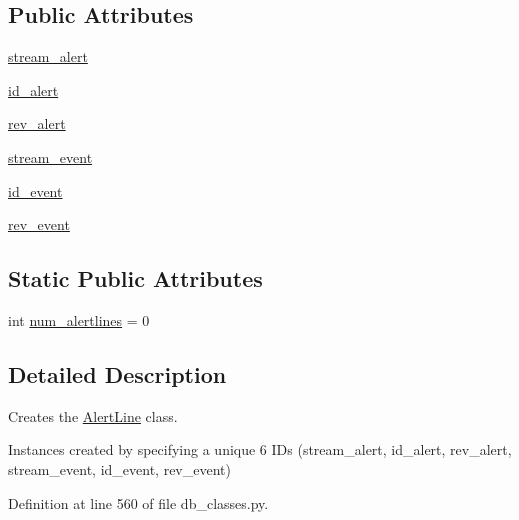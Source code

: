 \subsection*{Public Attributes}
\begin{DoxyCompactItemize}
\item 
\hyperlink{classamonpy_1_1dbase_1_1db__classes_1_1_alert_line_ab24de2d5e3f4418dc2b9c6c68c42ae41}{stream\-\_\-alert}
\item 
\hyperlink{classamonpy_1_1dbase_1_1db__classes_1_1_alert_line_afe155f528e6c01f810d95264e77ccee6}{id\-\_\-alert}
\item 
\hyperlink{classamonpy_1_1dbase_1_1db__classes_1_1_alert_line_acb48088679522c813ac7ad21924f98a1}{rev\-\_\-alert}
\item 
\hyperlink{classamonpy_1_1dbase_1_1db__classes_1_1_alert_line_a6081f9c41c7c34d54a565407f2308175}{stream\-\_\-event}
\item 
\hyperlink{classamonpy_1_1dbase_1_1db__classes_1_1_alert_line_abbf3c5c8916d6a655444f44a841705f7}{id\-\_\-event}
\item 
\hyperlink{classamonpy_1_1dbase_1_1db__classes_1_1_alert_line_a5180b21c821a1eb9540d88623e11378f}{rev\-\_\-event}
\end{DoxyCompactItemize}
\subsection*{Static Public Attributes}
\begin{DoxyCompactItemize}
\item 
int \hyperlink{classamonpy_1_1dbase_1_1db__classes_1_1_alert_line_a8450803058ff3da20dc1a9001b77082f}{num\-\_\-alertlines} = 0
\end{DoxyCompactItemize}


\subsection{Detailed Description}
Creates the \hyperlink{classamonpy_1_1dbase_1_1db__classes_1_1_alert_line}{Alert\-Line} class. 

Instances created by specifying a unique 6 I\-Ds (stream\-\_\-alert, id\-\_\-alert, rev\-\_\-alert, stream\-\_\-event, id\-\_\-event, rev\-\_\-event) 

Definition at line 560 of file db\-\_\-classes.\-py.



